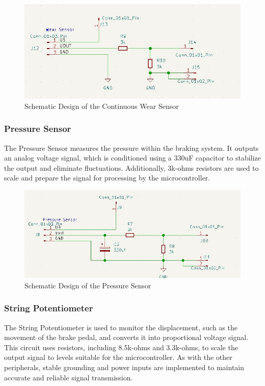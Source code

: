 \documentclass[12pt]{article}
\begin{document}
\begin{figure}[H]
  \includegraphics[width=\textwidth]{../assets/pcb/image3.jpg}
  \caption{Schematic Design of the Continuous Wear Sensor}
\end{figure}


\subsubsection*{Pressure Sensor}
The Pressure Sensor measures the pressure within the braking system. It outputs
an analog voltage signal, which is conditioned using a 330uF capacitor to
stabilize the output and eliminate fluctuations. Additionally, 3k-ohms
resistors are used to scale and prepare the signal for processing by the
microcontroller.

\begin{figure}[H]
  \includegraphics[width=\textwidth]{../assets/pcb/image4.jpg}
  \caption{Schematic Design of the Pressure Sensor}
\end{figure}

\subsubsection*{String Potentiometer}
The String Potentiometer is used to monitor the displacement, such as the
movement of the brake pedal, and converts it into proportional voltage signal.
This circuit uses resistors, including 8.5k-ohms and 3.3k-ohms, to scale the
output signal to levels suitable for the microcontroller. As with the other
peripherals, stable grounding and power inputs are implemented to maintain
accurate and reliable signal transmission.
\end{document}
